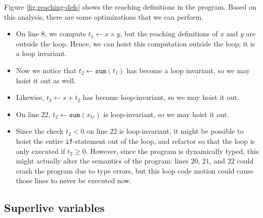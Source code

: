 \documentclass[11pt,letterpaper]{article}
\begin{document}
Figure \ref{fig:reaching-defs} shows the reaching definitions in the program.
Based on this analysis, there are some optimizations that we can perform.
\begin{itemize}
    \item On line $8$, we compute $t_1 \gets x \times y$, but the reaching
        definitions of $x$ and $y$ are outside the loop. Hence, we can hoist
        this computation outside the loop; it is a loop invariant.

    \item Now we notice that $t_2 \gets \mathtt{sum}(t_1)$ has become a loop
        invariant, so we may hoist it out as well.

    \item Likewise, $t_3 \gets s + t_2$ has become loop-invariant, so we may
        hoist it out.

    \item On line $22$, $t_2 \gets \mathtt{sum}(x_{tr})$ is loop-invariant, so
        we may hoist it out.

    \item Since the check $t_2 < 0$ on line $22$ is loop-invariant, it might be
        possible to hoist the entire \texttt{if}-statement out of the loop, and
        refactor so that the loop is only executed if $t_2 \geq 0$. However,
        since the program is dynamically typed, this might actually alter the
        semantics of the program: lines $20$, $21$, and $22$ could crash the
        program due to type errors, but this loop code motion could cause those
        lines to never be executed now.
\end{itemize}

\subsection{Superlive variables}
\end{document}

